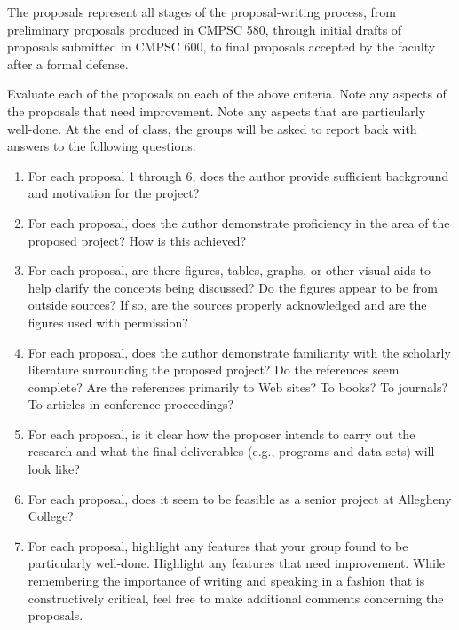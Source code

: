 The proposals represent all stages of the proposal-writing process,
from preliminary proposals produced in CMPSC 580, through initial drafts
of proposals submitted in CMPSC 600, to final proposals accepted by
the faculty after a formal defense. 

Evaluate each of the proposals on each of the above criteria. Note any
aspects of the proposals that need improvement. Note any aspects that
are particularly well-done. At the end of class, the groups will be asked
to report back with answers to the following questions:
\begin{enumerate}
\item
For each proposal 1 through 6, does the author provide sufficient background
and motivation for the project?
\item
For each proposal, does the author demonstrate proficiency in the area
of the proposed project? How is this achieved?
\item
For each proposal, are there figures, tables, graphs, or other
visual aids to help clarify the concepts being discussed? Do the
figures appear to be from outside sources? If so, are the
sources properly acknowledged and are the figures used with permission?
\item
For each proposal, does the author demonstrate familiarity with the
scholarly literature surrounding the proposed project? Do the
references seem complete? Are the references primarily to Web sites? To
books? To journals? To articles in conference proceedings?
\item
For each proposal, is it clear how the proposer intends to carry out
the research and what the final deliverables (e.g., programs and data sets) will look like?
\item
For each proposal, does it seem to be feasible as a senior project at
Allegheny College?
\item
For each proposal, highlight any features that your group found to be
particularly well-done. Highlight any features that need improvement.
While remembering the importance of writing and speaking in a fashion
that is constructively critical, feel free to make additional comments concerning the proposals.

\end{enumerate}




